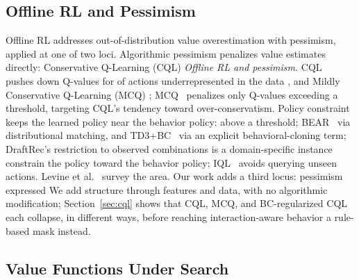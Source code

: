 \documentclass[journal]{IEEEtran}
\providecommand{\DIFaddtex}[1]{{\protect\color{blue} \sf #1}} %
\providecommand{\DIFdeltex}[1]{{\protect\color{red} \scriptsize #1}} %
\providecommand{\DIFaddbegin}{} %
\providecommand{\DIFaddend}{} %
\providecommand{\DIFdelbegin}{} %
\providecommand{\DIFdelend}{} %
\providecommand{\DIFadd}[1]{\texorpdfstring{\DIFaddtex{#1}}{#1}} %
\providecommand{\DIFdel}[1]{\texorpdfstring{\DIFdeltex{#1}}{}} %
\begin{document}
\DIFdelbegin \subsection{\DIFdel{Offline RL and Pessimism}}
\addtocounter{subsection}{-1}%

\DIFdel{Offline RL addresses out-of-distribution value overestimation with pessimism, applied at one of two loci. Algorithmic pessimism penalizes value estimates directly: Conservative Q-Learning (CQL)}\DIFdelend \DIFaddbegin \DIFadd{\textit{Offline RL and pessimism.} CQL}\DIFaddend ~\cite{kumar2020conservative} pushes down Q-values \DIFdelbegin \DIFdel{for }\DIFdelend \DIFaddbegin \DIFadd{of }\DIFaddend actions underrepresented in the data\DIFdelbegin \DIFdel{, and Mildly Conservative Q-Learning (MCQ)}\DIFdelend \DIFaddbegin \DIFadd{; MCQ}\DIFaddend ~\cite{lyu2022mildly} penalizes only Q-values \DIFdelbegin \DIFdel{exceeding a threshold, targeting CQL's tendency toward over-conservatism. Policy constraint keeps the learned policy near the behavior policy: }\DIFdelend \DIFaddbegin \DIFadd{above a threshold; }\DIFaddend BEAR~\cite{kumar2019stabilizing} \DIFdelbegin \DIFdel{via distributional matching, }\DIFdelend \DIFaddbegin \DIFadd{and }\DIFaddend TD3+BC~\cite{fujimoto2021minimalist} \DIFdelbegin \DIFdel{via an explicit behavioral-cloning term; DraftRec's restriction to observed combinations is a domain-specific instance}\DIFdelend \DIFaddbegin \DIFadd{constrain the policy toward the behavior policy; IQL~\cite{kostrikov2022iql} avoids querying unseen actions}\DIFaddend . Levine et al.~\cite{levine2020offline} survey the area. \DIFdelbegin \DIFdel{Our work adds a third locus: pessimism expressed }\DIFdelend \DIFaddbegin \DIFadd{We add structure }\DIFaddend through features and \DIFdelbegin \DIFdel{data, with no algorithmic modification; Section~\ref{sec:cql} shows that CQL, MCQ, and BC-regularized CQL each collapse, in different ways, before reaching interaction-aware behavior}\DIFdelend \DIFaddbegin \DIFadd{a rule-based mask instead}\DIFaddend .

\DIFdelbegin \subsection{\DIFdel{Value Functions Under Search}}
\addtocounter{subsection}{-1}%
\end{document}
